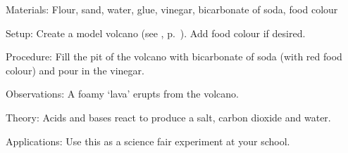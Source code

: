 \begin{multicols}{2}
\begin{description*}
\item[Materials:]{Flour, sand, water, glue, vinegar, bicarbonate of soda, food colour}
\item[Setup:]{Create a model volcano (see , p.~\pageref{cha:models}). Add food colour if desired.}
\item[Procedure:]{Fill the pit of the volcano with bicarbonate of soda (with red food colour) and pour in the vinegar.}
\item[Observations:]{A foamy `lava' erupts from the volcano.}
\item[Theory:]{Acids and bases react to produce a salt, carbon dioxide and water.}
\item[Applications:]{Use this as a science fair experiment at your school.}
\end{description*}

%
%



\end{multicols}
